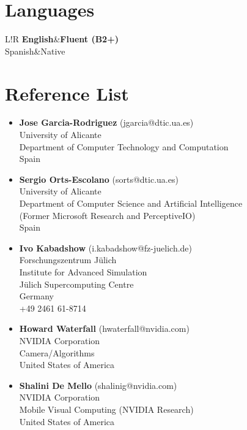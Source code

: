 \documentclass[8pt]{article}
\newcommand\VRule{\color{lightgray}\vrule width 0.5pt}
\begin{document}
\section*{Languages}
\begin{tabular}{L!{\VRule}R}
{\bf English}&{\bf Fluent (B2+)}\\
{Spanish}&{Native}\\
\end{tabular}

\section*{Reference List}
\begin{itemize}
	\item {\textbf{Jose Garcia-Rodriguez} (jgarcia@dtic.ua.es)\\
    University of Alicante\\
    Department of Computer Technology and Computation\\
    Spain\\}
	\item {\textbf{Sergio Orts-Escolano} (sorts@dtic.ua.es)\\
University of Alicante\\
		Department of Computer Science and Artificial Intelligence\\
		(Former Microsoft Research and PerceptiveIO)\\
		Spain\\}

  \item {\textbf{Ivo Kabadshow} (i.kabadshow@fz-juelich.de)\\
    Forschungszentrum Jülich\\
    Institute for Advanced Simulation\\
    Jülich Supercomputing Centre\\
    Germany\\
    +49 2461 61-8714\\}

  \item {\textbf{Howard Waterfall} (hwaterfall@nvidia.com)\\
	NVIDIA Corporation\\
	Camera/Algorithms\\
	United States of America\\}

  \item{\textbf{Shalini De Mello} (shalinig@nvidia.com)\\
	NVIDIA Corporation\\
	Mobile Visual Computing (NVIDIA Research)\\
	United States of America\\}

\end{itemize}
 
\end{document}
